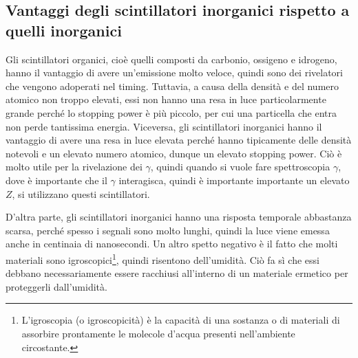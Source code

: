 \subsection{Vantaggi degli scintillatori inorganici rispetto a quelli inorganici}

Gli scintillatori organici, cioè quelli composti da carbonio, ossigeno e idrogeno, hanno il vantaggio di avere un'emissione molto veloce, quindi sono dei rivelatori che vengono adoperati nel timing. Tuttavia, a causa della densità e del numero atomico non troppo elevati, essi non hanno una resa in luce particolarmente grande perché lo stopping power è più piccolo, per cui una particella che entra non perde tantissima energia. Viceversa, gli scintillatori inorganici hanno il vantaggio di avere una resa in luce elevata perché hanno tipicamente delle densità notevoli e un elevato numero atomico, dunque un elevato stopping power. Ciò è molto utile per la rivelazione dei $\gamma$, quindi quando si vuole fare spettroscopia $\gamma$, dove è importante che il $\gamma$ interagisca, quindi è importante importante un elevato $Z$, si utilizzano questi scintillatori.

D'altra parte, gli scintillatori inorganici hanno una risposta temporale abbastanza scarsa, perché spesso i segnali sono molto lunghi, quindi la luce viene emessa anche in centinaia di nanosecondi. Un altro spetto negativo è il fatto che molti materiali sono igroscopici\footnote{L'igroscopia (o igroscopicità) è la capacità di una sostanza o di materiali di assorbire prontamente le molecole d'acqua presenti nell'ambiente circostante.}, quindi risentono dell'umidità. Ciò fa sì che essi debbano necessariamente essere racchiusi all'interno di un materiale ermetico per proteggerli dall'umidità. 

